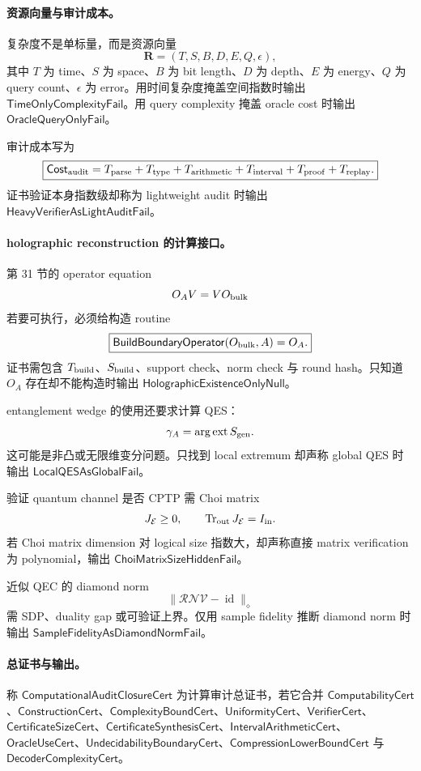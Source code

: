 \paragraph{资源向量与审计成本。}
复杂度不是单标量，而是资源向量
\[
\boxed{
\mathbf R=(T,S,B,D,E,Q,\epsilon),
}
\]
其中 \(T\) 为 time、\(S\) 为 space、\(B\) 为 bit length、\(D\) 为 depth、\(E\) 为 energy、\(Q\) 为 query count、\(\epsilon\) 为 error。用时间复杂度掩盖空间指数时输出 \(\mathsf{TimeOnlyComplexityFail}\)。用 query complexity 掩盖 oracle cost 时输出 \(\mathsf{OracleQueryOnlyFail}\)。

审计成本写为
\[
\boxed{
\mathsf{Cost}_{\rm audit}
=
T_{\rm parse}
+T_{\rm type}
+T_{\rm arithmetic}
+T_{\rm interval}
+T_{\rm proof}
+T_{\rm replay}.
}
\]
证书验证本身指数级却称为 lightweight audit 时输出 \(\mathsf{HeavyVerifierAsLightAuditFail}\)。

\paragraph{holographic reconstruction 的计算接口。}
第 31 节的 operator equation
\[
O_AV=VO_{\rm bulk}
\]
若要可执行，必须给构造 routine
\[
\boxed{
\mathsf{BuildBoundaryOperator}(O_{\rm bulk},A)=O_A.
}
\]
证书需包含 \(T_{\rm build}\)、\(S_{\rm build}\)、support check、norm check 与 round hash。只知道 \(O_A\) 存在却不能构造时输出 \(\mathsf{HolographicExistenceOnlyNull}\)。

entanglement wedge 的使用还要求计算 QES：
\[
\gamma_A=\operatorname*{arg\,ext}S_{\rm gen}.
\]
这可能是非凸或无限维变分问题。只找到 local extremum 却声称 global QES 时输出 \(\mathsf{LocalQESAsGlobalFail}\)。

验证 quantum channel 是否 CPTP 需 Choi matrix
\[
J_{\mathcal E}\ge0,
\qquad
\operatorname{Tr}_{\rm out}J_{\mathcal E}=I_{\rm in}.
\]
若 Choi matrix dimension 对 logical size 指数大，却声称直接 matrix verification 为 polynomial，输出 \(\mathsf{ChoiMatrixSizeHiddenFail}\)。

近似 QEC 的 diamond norm
\[
\|\mathcal R\mathcal N\mathcal V-\operatorname{id}\|_\diamond
\]
需 SDP、duality gap 或可验证上界。仅用 sample fidelity 推断 diamond norm 时输出 \(\mathsf{SampleFidelityAsDiamondNormFail}\)。

\paragraph{总证书与输出。}
称 \(\mathsf{ComputationalAuditClosureCert}\) 为计算审计总证书，若它合并 \(\mathsf{ComputabilityCert}\)、\(\mathsf{ConstructionCert}\)、\(\mathsf{ComplexityBoundCert}\)、\(\mathsf{UniformityCert}\)、\(\mathsf{VerifierCert}\)、\(\mathsf{CertificateSizeCert}\)、\(\mathsf{CertificateSynthesisCert}\)、\(\mathsf{IntervalArithmeticCert}\)、\(\mathsf{OracleUseCert}\)、\(\mathsf{UndecidabilityBoundaryCert}\)、\(\mathsf{CompressionLowerBoundCert}\) 与 \(\mathsf{DecoderComplexityCert}\)。

